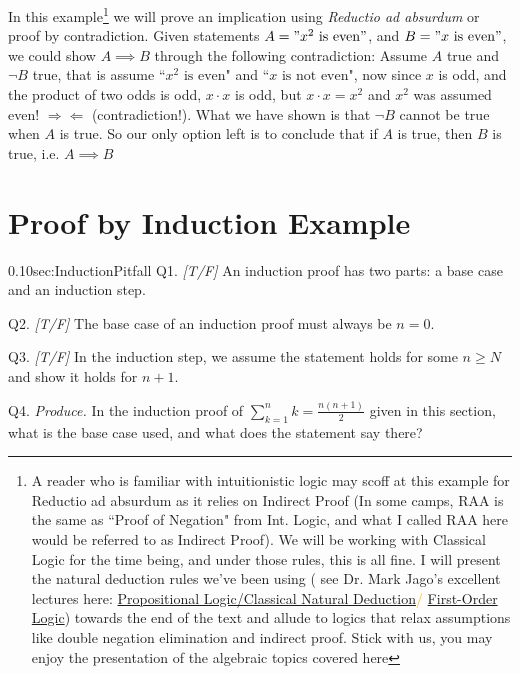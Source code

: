 In this example\footnote{ A reader who is familiar with intuitionistic logic may scoff at this example for Reductio ad absurdum as it relies on Indirect Proof (In some camps, RAA is the same as ``Proof of Negation" from Int. Logic, and what I called RAA here would be referred to as Indirect Proof). We will be working with Classical Logic for the time being, and under those rules, this is all fine. I will present the natural deduction rules we've been using ( see Dr. Mark Jago's excellent lectures here: \textcolor{orange}{\href{https://www.youtube.com/watch?v=dlUkeN7KqVA&t=8s}{Propositional Logic/Classical Natural Deduction}/ \href{https://www.youtube.com/watch?v=C30w5vZypXE}{First-Order Logic}}) towards the end of the text and allude to logics that relax assumptions like double negation elimination and indirect proof. Stick with us, you may enjoy the presentation of the algebraic topics covered here \smiley } we will prove an implication using \textit{Reductio ad absurdum} or proof by contradiction. Given statements $A= "x^2 \text{ is even}"$, and $B= "x \text{ is even}"$, we could show $A\implies B$ through the following contradiction: Assume $A$ true and $\lnot B$ true, that is assume ``$x^2 \text{ is even}$" and ``$x \text{ is not even}$", now since $x$ is odd, and the product of two odds is odd, $x\cdot x$ is odd, but $x\cdot x=x^2$ and $x^2$ was assumed even! $\Rightarrow\Leftarrow$ (contradiction!). What we have shown is that $\lnot B$ cannot be true when $A$ is true. So our only option left is to conclude that if $A$ is true, then $B$ is true, i.e. $A\implies B$

\section{Proof by Induction Example}
\label{sec:InductionExample}

\begin{selfcheckbox}{0.10}{sec:InductionPitfall}
  \hypertarget{q:ch0:induction}{}
  Q1. \textit{[T/F]} An induction proof has two parts: a base case and an induction step.\par\smallskip
  Q2. \textit{[T/F]} The base case of an induction proof must always be $n = 0$.\par\smallskip
  Q3. \textit{[T/F]} In the induction step, we assume the statement holds for some $n \geq N$ and show it holds for $n + 1$.\par\smallskip
  Q4. \textit{Produce.} In the induction proof of $\sum_{k=1}^n k = \tfrac{n(n+1)}{2}$ given in this section, what is the base case used, and what does the statement say there?
  \par\medskip\hfill{}
\end{selfcheckbox}

